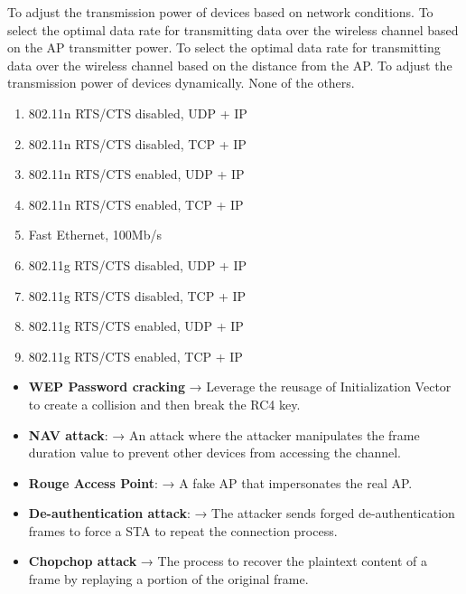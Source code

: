 

\begin{checkboxes}
    \choice To adjust the transmission power of devices based on network conditions.
    \choice To select the optimal data rate for transmitting data over the wireless channel based on the AP transmitter power.
    \choice To select the optimal data rate for transmitting data over the wireless channel based on the distance from the AP.
    \choice To adjust the transmission power of devices dynamically.
    \CorrectChoice None of the others.
\end{checkboxes}

\begin{solution}
    \begin{enumerate}
        \item 802.11n RTS/CTS disabled, UDP + IP
        \item 802.11n RTS/CTS disabled, TCP + IP
        \item 802.11n RTS/CTS enabled, UDP + IP
        \item 802.11n RTS/CTS enabled, TCP + IP
        \item Fast Ethernet, 100Mb/s
        \item 802.11g RTS/CTS disabled, UDP + IP
        \item 802.11g RTS/CTS disabled, TCP + IP
        \item 802.11g RTS/CTS enabled, UDP + IP
        \item 802.11g RTS/CTS enabled, TCP + IP
    \end{enumerate}
\end{solution}


\begin{solution}
    \begin{itemize}
        \item \textbf{WEP Password cracking} → Leverage the reusage of Initialization Vector to create a collision and then break the RC4 key.
        \item \textbf{NAV attack}: → An attack where the attacker manipulates the frame duration value to prevent other devices from accessing the channel.
        \item \textbf{Rouge Access Point}: → A fake AP that impersonates the real AP.
        \item \textbf{De-authentication attack}: → The attacker sends forged de-authentication frames to force a STA to repeat the connection process.
        \item \textbf{Chopchop attack} → The process to recover the plaintext content of a frame by replaying a portion of the original frame.
    \end{itemize}
\end{solution}

